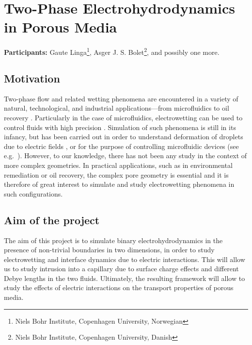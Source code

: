 \documentclass[a4paper,10pt]{article}
\begin{document}
\section*{\Large Two-Phase Electrohydrodynamics in Porous Media}
\textbf{Participants:} Gaute Linga\footnote{Niels Bohr Institute, Copenhagen University, Norwegian}, Asger J. S. Bolet\footnote{Niels Bohr Institute, Copenhagen University, Danish}, and possibly one more.


\subsection*{Motivation}
Two-phase flow and related wetting phenomena are encountered in a variety of natural, technological, and industrial applications---from microfluidics to oil recovery \cite{bonn2009}. 
Particularly in the case of microfluidics, electrowetting can be used to control fluids with high precision \cite{mugele2005}.
Simulation of such phenomena is still in its infancy, but has been carried out in order to understand deformation of droplets due to electric fields \cite{yang2013,yang2014}, or for the purpose of controlling microfluidic devices (see e.g.~\cite{zeng2011}). 
However, to our knowledge, there has not been any study in the context of more complex geometries. 
In practical applications, such as in environmental remediation or oil recovery, the complex pore geometry is essential and it is therefore of great interest to simulate and study electrowetting phenomena in such configurations.

\subsection*{Aim of the project}
The aim of this project is to simulate binary electrohydrodynamics in the presence of non-trivial boundaries in two dimensions, in order to study electrowetting and interface dynamics due to electric interactions.
This will allow us to study intrusion into a capillary due to surface charge effects and different Debye lengths in the two fluids.
Ultimately, the resulting framework will allow to study the effects of electric interactions on the transport properties of porous media.
\end{document}
